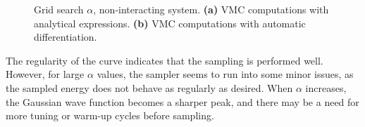 \begin{figure}[H]
\centering
{}
\qquad
{}
\caption{Grid search $\alpha$, non-interacting system. \textbf{(a)} VMC computations with analytical expressions. \textbf{(b)} VMC computations with automatic differentiation.}
\label{fig:gridsearch}
\end{figure}

The regularity of the curve indicates that the sampling is performed well. However, for large $\alpha$ values, the sampler seems to run into some minor issues, as the sampled energy does not behave as regularly as desired. When $\alpha$ increases, the Gaussian wave function becomes a sharper peak, and there may be a need for more tuning or warm-up cycles before sampling. 

